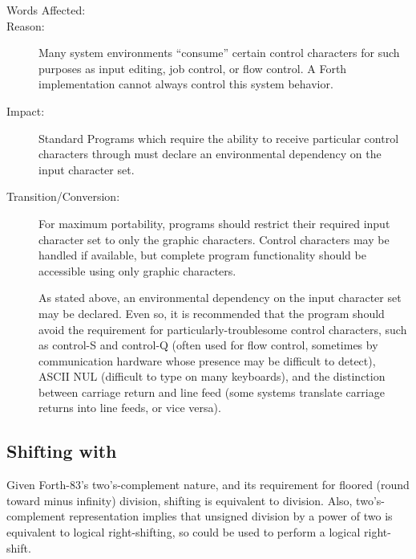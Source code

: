 \begin{description}
\item[Words Affected:]

\item[Reason:]
	Many system environments ``consume'' certain control characters
	for such purposes as input editing, job control, or flow control.
	A Forth implementation cannot always control this system behavior.

\item[Impact:]
	Standard Programs which require the ability to receive particular
	control characters through  must declare an environmental
	dependency on the input character set.

\item[Transition/Conversion:]
	For maximum portability, programs should restrict their required
	input character set to only the graphic characters. Control
	characters may be handled if available, but complete program
	functionality should be accessible using only graphic characters.

	As stated above, an environmental dependency on the input character
	set may be declared. Even so, it is recommended that the program
	should avoid the requirement for particularly-troublesome control
	characters, such as control-S and control-Q (often used for flow
	control, sometimes by communication hardware whose presence may be
	difficult to detect), ASCII NUL (difficult to type on many keyboards),
	and the distinction between carriage return and line feed (some
	systems translate carriage returns into line feeds, or vice versa).
\end{description}


\subsection{Shifting with } %

Given Forth-83's two's-complement nature, and its requirement for
floored (round toward minus infinity) division, shifting is equivalent
to division. Also, two's-complement representation implies that
unsigned division by a power of two is equivalent to logical
right-shifting, so  could be used to perform a logical
right-shift.

